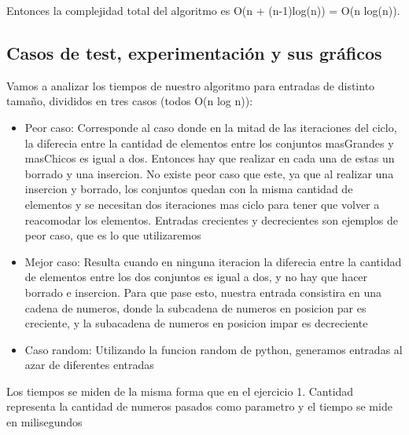 Entonces la complejidad total del algoritmo es O(n + (n-1)log(n)) = O(n log(n)).

\subsection{Casos de test, experimentación y sus gráficos}
Vamos a analizar los tiempos de nuestro algoritmo para entradas de distinto tamaño, divididos en tres casos (todos O(n log n)):
\begin{itemize}
\item Peor caso: Corresponde al caso donde en la mitad de las iteraciones del ciclo, la diferecia entre la cantidad de elementos entre los conjuntos masGrandes y masChicos es igual a dos. Entonces hay que realizar en cada una de estas un borrado y una insercion. No existe peor caso que este, ya que al realizar una insercion y borrado, los conjuntos quedan con la misma cantidad de elementos y se necesitan dos iteraciones mas ciclo para tener que volver a reacomodar los elementos. Entradas crecientes y decrecientes son ejemplos de peor caso, que es lo que utilizaremos
\item Mejor caso: Resulta cuando en ninguna iteracion la diferecia entre la cantidad de elementos entre los dos conjuntos es igual a dos, y no hay que hacer borrado e insercion. Para que pase esto, nuestra entrada consistira en una cadena de numeros, donde la subcadena de numeros en posicion par es creciente, y la subacadena de numeros en posicion impar es decreciente 
\item Caso random: Utilizando la funcion random de python, generamos entradas al azar de diferentes entradas
\end{itemize}
Los tiempos se miden de la misma forma que en el ejercicio 1. Cantidad representa la cantidad de numeros pasados como parametro y el tiempo se mide en milisegundos
